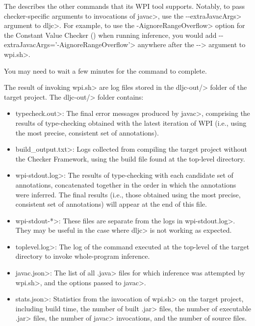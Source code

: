 \begin{description}
  The 
  describes the other commands that its WPI tool supports. Notably, to pass checker-specific
  arguments to invocations of \<javac>,
  use the \<-\relax-extraJavacArgs> argument to \<dljc>. For example, to use the \<-AignoreRangeOverflow>
  option for the Constant Value Checker () when running
  inference, you would add \<-\relax-extraJavacArgs='-AignoreRangeOverflow'> anywhere after the \<-\relax->
  argument to \<wpi.sh>.
\end{description}

You may need to wait a few minutes for the command to complete.


The result of invoking \<wpi.sh> are log files stored in the \<dljc-out/> folder
of the target project.
The \<dljc-out/> folder contains:

\begin{itemize}
\item \<typecheck.out>: The final error messages produced by \<javac>,
  comprising the results of type-checking obtained with the
  latest iteration of WPI (i.e., using the most precise, consistent set of
  annotations).
\item \<build\_output.txt>: Logs collected from compiling the target project
  without the Checker Framework, using the build file found at the
  top-level directory.
\item \<wpi-stdout.log>: The results of type-checking with each candidate set of
  annotations, concatenated together in the order in which the annotations
  were inferred.
  The final results (i.e., those obtained using the most precise, consistent
  set of annotations) will appear at the end of this file.
\item \<wpi-stdout-*>: These files are separate from the logs in \<wpi-stdout.log>.
  They may be useful in the case where \<dljc> is not working as expected.
\item \<toplevel.log>: The log of the command executed at the top-level of the
  target directory to invoke whole-program inference.
\item \<javac.json>: The list of all \<.java> files for which inference was
  attempted by \<wpi.sh>, and the options passed to \<javac>.
\item \<stats.json>: Statistics from the invocation of \<wpi.sh> on the target
  project, including build time, the number of built \<.jar> files, the number of
  executable \<.jar> files, the number of \<javac> invocations, and the number of
  source files.
\end{itemize}


